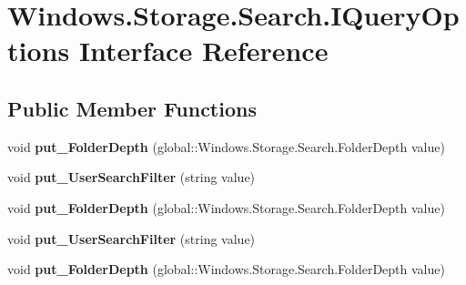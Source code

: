 \hypertarget{interface_windows_1_1_storage_1_1_search_1_1_i_query_options}{}\section{Windows.\+Storage.\+Search.\+I\+Query\+Options Interface Reference}
\label{interface_windows_1_1_storage_1_1_search_1_1_i_query_options}
\subsection*{Public Member Functions}
\begin{DoxyCompactItemize}
\item 
\mbox{\label{interface_windows_1_1_storage_1_1_search_1_1_i_query_options_a3737ff88fed7b38ed657d3a658354a4a}} 
void {\bfseries put\+\_\+\+Folder\+Depth} (global\+::\+Windows.\+Storage.\+Search.\+Folder\+Depth value)
\item 
\mbox{\label{interface_windows_1_1_storage_1_1_search_1_1_i_query_options_a447a6f5174a79844dd8edacd9616d879}} 
void {\bfseries put\+\_\+\+User\+Search\+Filter} (string value)
\item 
\mbox{\label{interface_windows_1_1_storage_1_1_search_1_1_i_query_options_a3737ff88fed7b38ed657d3a658354a4a}} 
void {\bfseries put\+\_\+\+Folder\+Depth} (global\+::\+Windows.\+Storage.\+Search.\+Folder\+Depth value)
\item 
\mbox{\label{interface_windows_1_1_storage_1_1_search_1_1_i_query_options_a447a6f5174a79844dd8edacd9616d879}} 
void {\bfseries put\+\_\+\+User\+Search\+Filter} (string value)
\item 
\mbox{\label{interface_windows_1_1_storage_1_1_search_1_1_i_query_options_a3737ff88fed7b38ed657d3a658354a4a}} 
void {\bfseries put\+\_\+\+Folder\+Depth} (global\+::\+Windows.\+Storage.\+Search.\+Folder\+Depth value)
\item 
\mbox{\label{interface_windows_1_1_storage_1_1_search_1_1_i_query_options_a447a6f5174a79844dd8edacd9616d879}} 

\end{DoxyCompactItemize}
